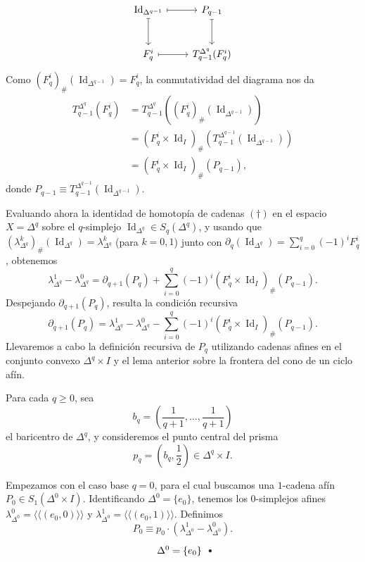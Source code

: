 \begin{dem}
\[\begin{tikzcd}[column sep=2.2em, row sep=2.6em]
\operatorname{Id}_{\Delta^{q-1}} \arrow[r, mapsto] \arrow[d, mapsto] & P_{q-1} \arrow[d, mapsto] \\
F_q^i \arrow[r, mapsto] & T_{q-1}^{\Delta^q}(F_q^i)
\end{tikzcd}
\]
Como $(F_q^i)_\#(\operatorname{Id}_{\Delta^{q-1}}) = F_q^i$, la conmutatividad del diagrama nos da
\begin{align*}
T_{q-1}^{\Delta^q}(F_q^i) &= T_{q-1}^{\Delta^q}\!\left((F_q^i)_\#(\operatorname{Id}_{\Delta^{q-1}})\right) \\
&= (F_q^i \times \operatorname{Id}_I)_\#\!\left(T_{q-1}^{\Delta^{q-1}}(\operatorname{Id}_{\Delta^{q-1}})\right) \\
&= (F_q^i \times \operatorname{Id}_I)_\#(P_{q-1}),
\end{align*}
donde $P_{q-1} \equiv T_{q-1}^{\Delta^{q-1}}(\operatorname{Id}_{\Delta^{q-1}})$.

Evaluando ahora la identidad de homotopía de cadenas $(\dagger)$ en el espacio $X = \Delta^q$ sobre el $q$-simplejo $\operatorname{Id}_{\Delta^q} \in S_q(\Delta^q)$, y usando que $(\lambda^k_{\Delta^q})_\#(\operatorname{Id}_{\Delta^q}) = \lambda^k_{\Delta^q}$ (para $k = 0, 1$) junto con $\partial_q(\operatorname{Id}_{\Delta^q}) = \sum_{i=0}^q (-1)^i F_q^i$, obtenemos
\[
\lambda^1_{\Delta^q} - \lambda^0_{\Delta^q} = \partial_{q+1}(P_q) + \sum_{i=0}^q (-1)^i (F_q^i \times \operatorname{Id}_I)_\#(P_{q-1}).
\]
Despejando $\partial_{q+1}(P_q)$, resulta la condición recursiva
\[
\partial_{q+1}(P_q) = \lambda^1_{\Delta^q} - \lambda^0_{\Delta^q} - \sum_{i=0}^q (-1)^i (F_q^i \times \operatorname{Id}_I)_\#(P_{q-1}).
\]
Llevaremos a cabo la definición recursiva de $P_q$ utilizando cadenas afines en el conjunto convexo $\Delta^q \times I$ y el lema anterior sobre la frontera del cono de un ciclo afín.

Para cada $q \geq 0$, sea
\[
b_q = \left(\frac{1}{q+1}, \dots, \frac{1}{q+1}\right)
\]
el baricentro de $\Delta^q$, y consideremos el punto central del prisma
\[
p_q = \left(b_q, \frac{1}{2}\right) \in \Delta^q \times I.
\]

Empezamos con el caso base $q = 0$, para el cual buscamos una $1$-cadena afín $P_0 \in S_1(\Delta^0 \times I)$. Identificando $\Delta^0 = \{e_0\}$, tenemos los $0$-simplejos afines $\lambda_{\Delta^0}^0 = \langle\!\langle (e_0, 0) \rangle\!\rangle$ y $\lambda_{\Delta^0}^1 = \langle\!\langle (e_0, 1) \rangle\!\rangle$. Definimos
\[
P_0 \equiv p_0 \cdot (\lambda_{\Delta^0}^1 - \lambda_{\Delta^0}^0).
\]
\[
\begin{tikzpicture}[baseline=(current bounding box.center), scale=0.95]
    \coordinate (D) at (0, 1.6);
    \fill[black!85] (D) circle (1.6pt);
    \node[left=5pt] at (D) {$\Delta^0 = \{e_0\}$};


\end{tikzpicture}\]
\end{dem}
